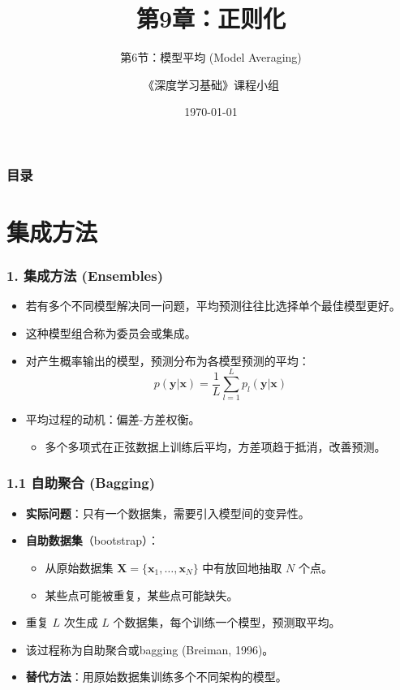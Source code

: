 \documentclass[t,aspectratio=169]{beamer} %
\title[9.6.模型平均]{第9章：正则化}
\subtitle{第6节：模型平均 (Model Averaging)}
\author{《深度学习基础》课程小组}
\date{\today}
\begin{document}
\frame{\titlepage}

\begin{frame}
    \frametitle{目录}
    \tableofcontents
\end{frame}

\section{集成方法}

\begin{frame}
    \frametitle{1. 集成方法 (Ensembles)}
    \begin{itemize}
        \item 若有多个不同模型解决同一问题，\alert{平均预测}往往比选择单个最佳模型更好。
        \item 这种模型组合称为\alert{委员会}或\alert{集成}。
        \item 对产生概率输出的模型，预测分布为各模型预测的平均：
        \begin{equation}
            p(\mathbf{y}|\mathbf{x}) = \frac{1}{L} \sum_{l=1}^{L} p_l(\mathbf{y}|\mathbf{x})
            \tag{9.42}
        \end{equation}
        \item 平均过程的动机：\alert{偏差-方差权衡}。
        \begin{itemize}
            \item 多个多项式在正弦数据上训练后平均，方差项趋于\alert{抵消}，改善预测。
        \end{itemize}
    \end{itemize}
\end{frame}

\begin{frame}
    \frametitle{1.1 自助聚合 (Bagging)}
    \begin{itemize}
        \item \textbf{实际问题}：只有一个数据集，需要引入模型间的\alert{变异性}。
        \item \textbf{自助数据集}（bootstrap）：
        \begin{itemize}
            \item 从原始数据集 $\mathbf{X} = \{\mathbf{x}_1, \ldots, \mathbf{x}_N\}$ 中\alert{有放回}地抽取 $N$ 个点。
            \item 某些点可能被重复，某些点可能缺失。
        \end{itemize}
        \item 重复 $L$ 次生成 $L$ 个数据集，每个训练一个模型，预测取平均。
        \item 该过程称为\alert{自助聚合}或\alert{bagging} (Breiman, 1996)。
        \item \textbf{替代方法}：用原始数据集训练多个\alert{不同架构}的模型。
    \end{itemize}
\end{frame}
\end{document}
